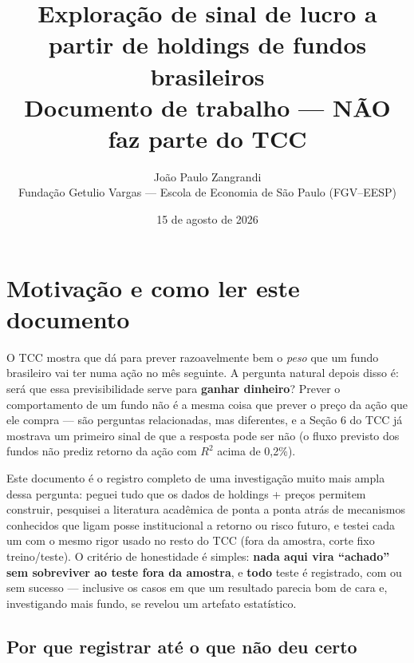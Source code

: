 \documentclass[11pt,a4paper]{article}
\title{Exploração de sinal de lucro a partir de holdings de fundos brasileiros\\
\large Documento de trabalho --- NÃO faz parte do TCC}
\author{João Paulo Zangrandi\\
Fundação Getulio Vargas --- Escola de Economia de São Paulo (FGV--EESP)}
\date{15 de agosto de 2026}
\begin{document}
\maketitle

\begin{center}
\end{center}

\tableofcontents
\newpage

\section{Motivação e como ler este documento}

O TCC mostra que dá para prever razoavelmente bem o \emph{peso} que um
fundo brasileiro vai ter numa ação no mês seguinte. A pergunta natural
depois disso é: será que essa previsibilidade serve para \textbf{ganhar
dinheiro}? Prever o comportamento de um fundo não é a mesma coisa que
prever o preço da ação que ele compra --- são perguntas relacionadas, mas
diferentes, e a Seção 6 do TCC já mostrava um primeiro sinal de que a
resposta pode ser não (o fluxo previsto dos fundos não prediz retorno da
ação com $R^2$ acima de 0,2\%).

Este documento é o registro completo de uma investigação muito mais ampla
dessa pergunta: peguei tudo que os dados de holdings + preços permitem
construir, pesquisei a literatura acadêmica de ponta a ponta atrás de
mecanismos conhecidos que ligam posse institucional a retorno ou risco
futuro, e testei cada um com o mesmo rigor usado no resto do TCC (fora da
amostra, corte fixo treino/teste). O critério de honestidade é simples:
\textbf{nada aqui vira ``achado'' sem sobreviver ao teste fora da amostra},
e \textbf{todo} teste é registrado, com ou sem sucesso --- inclusive os
casos em que um resultado parecia bom de cara e, investigando mais fundo,
se revelou um artefato estatístico.

\subsection{Por que registrar até o que não deu certo}
\end{document}
